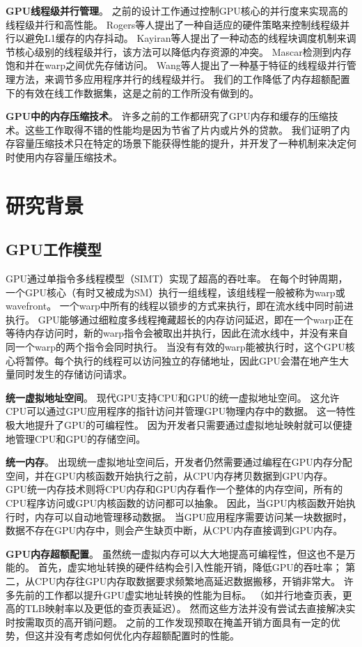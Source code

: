 \textbf{GPU线程级并行管理}。
之前的设计工作通过控制GPU核心的并行度来实现高的线程级并行和高性能。
Rogers等人提出了一种自适应的硬件策略来控制线程级并行以避免L1缓存的内存抖动。
Kayiran等人提出了一种动态的线程块调度机制来调节核心级别的线程级并行，该方法可以降低内存资源的冲突。
Mascar检测到内存饱和并在warp之间优先存储访问。
Wang等人提出了一种基于特征的线程级并行管理方法，来调节多应用程序并行的线程级并行。
我们的工作降低了内存超额配置下的有效在线工作数据集，这是之前的工作所没有做到的。

\textbf{GPU中的内存压缩技术}。
许多之前的工作都研究了GPU内存和缓存的压缩技术。这些工作取得不错的性能均是因为节省了片内或片外的贷款。
我们证明了内存容量压缩技术只在特定的场景下能获得性能的提升，并开发了一种机制来决定何时使用内存容量压缩技术。



\section{研究背景}

\subsection{GPU工作模型}
GPU通过单指令多线程模型（SIMT）实现了超高的吞吐率。
在每个时钟周期，一个GPU核心（有时又被成为SM）执行一组线程，该组线程一般被称为warp或wavefront。
一个warp中所有的线程以锁步的方式来执行，即在流水线中同时前进执行。
GPU能够通过细粒度多线程掩藏超长的内存访问延迟，即在一个warp正在等待内存访问时，新的warp指令会被取出并执行，因此在流水线中，并没有来自同一个warp的两个指令会同时执行。
当没有有效的warp能被执行时，这个GPU核心将暂停。每个执行的线程可以访问独立的存储地址，因此GPU会潜在地产生大量同时发生的存储访问请求。

\textbf{统一虚拟地址空间}。
现代GPU支持CPU和GPU的统一虚拟地址空间。
这允许CPU可以通过GPU应用程序的指针访问并管理GPU物理内存中的数据。
这一特性极大地提升了GPU的可编程性。
因为开发者只需要通过虚拟地址映射就可以便捷地管理CPU和GPU的存储空间。

\textbf{统一内存}。
出现统一虚拟地址空间后，开发者仍然需要通过编程在GPU内存分配空间，并在GPU内核函数开始执行之前，从CPU内存拷贝数据到GPU内存。
GPU统一内存技术则将CPU内存和GPU内存看作一个整体的内存空间，所有的CPU程序访问或GPU内核函数的访问都可以抽象。
因此，当GPU内核函数开始执行时，内存可以自动地管理移动数据。
当GPU应用程序需要访问某一块数据时，数据不存在GPU内存中，则会产生缺页中断，从CPU内存直接调到GPU内存。

\textbf{GPU内存超额配置}。
虽然统一虚拟内存可以大大地提高可编程性，但这也不是万能的。
首先，虚实地址转换的硬件结构会引入性能开销，降低GPU的吞吐率；
第二，从CPU内存往GPU内存取数据要求频繁地高延迟数据搬移，开销非常大。
许多先前的工作都以提升GPU虚实地址转换的性能为目标。
（如并行地查页表，更高的TLB映射率以及更低的查页表延迟）。 
然而这些方法并没有尝试去直接解决实时按需取页的高开销问题。
之前的工作发现预取在掩盖开销方面具有一定的优势，但这并没有考虑如何优化内存超额配置时的性能。

